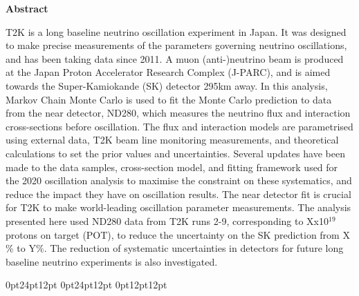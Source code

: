 \begin{center}
\textbf{Abstract} 
\newline
\end{center}

T2K is a long baseline neutrino oscillation experiment in Japan. It was designed to make precise measurements of the parameters governing neutrino oscillations, and has been taking data since 2011. A muon (anti-)neutrino beam is produced at the Japan Proton Accelerator Research Complex (J-PARC), and is aimed towards the Super-Kamiokande (SK) detector 295km away. In this analysis, Markov Chain Monte Carlo is used to fit the Monte Carlo prediction to data from the near detector, ND280, which measures the neutrino flux and interaction cross-sections before oscillation. The flux and interaction models are parametrised using external data, T2K beam line monitoring measurements, and theoretical calculations to set the prior values and uncertainties. Several updates have been made to the data samples, cross-section model, and fitting framework used for the 2020 oscillation analysis to maximise the constraint on these systematics, and reduce the impact they have on oscillation results. The near detector fit is crucial for T2K to make world-leading oscillation parameter measurements. The analysis presented here used ND280 data from T2K runs 2-9, corresponding to Xx10$^{19}$ protons on target (POT), to reduce the uncertainty on the SK prediction from X$\%$ to Y$\%$. The reduction of systematic uncertainties in detectors for future long baseline neutrino experiments is also investigated. 

\newpage
\tableofcontents
\newpage
\listoffigures
\newpage
\listoftables
\newpage
\mainmatter
{}
\parskip 0pt
\titlespacing*{\chapter}
{0pt}{24pt}{12pt}
\titlespacing*{\section}
{0pt}{24pt}{12pt}
\titlespacing*{\subsection}
{0pt}{12pt}{12pt}